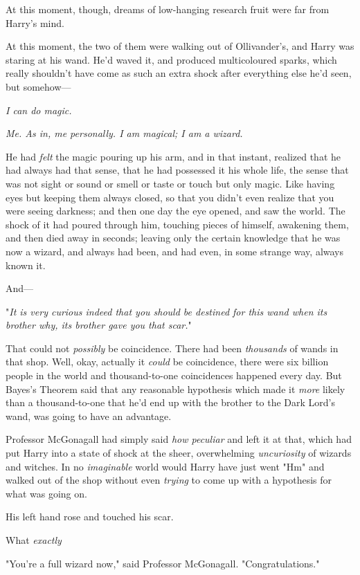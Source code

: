 At this moment, though, dreams of low-hanging research fruit were far from
Harry's mind.

At this moment, the two of them were walking out of Ollivander's, and Harry was
staring at his wand. He'd waved it, and produced multicoloured sparks, which
really shouldn't have come as such an extra shock after everything else he'd
seen, but somehow—

\emph{I can do magic.}

\emph{Me. As in, me personally. I am magical; I am a wizard.}

He had \emph{felt} the magic pouring up his arm, and in that instant, realized
that he had always had that sense, that he had possessed it his whole life, the
sense that was not sight or sound or smell or taste or touch but only magic.
Like having eyes but keeping them always closed, so that you didn't even
realize that you were seeing darkness; and then one day the eye opened, and saw
the world. The shock of it had poured through him, touching pieces of himself,
awakening them, and then died away in seconds; leaving only the certain
knowledge that he was now a wizard, and always had been, and had even, in some
strange way, always known it.

And—

"\emph{It is very curious indeed that you should be destined for this wand when
its brother why, its brother gave you that scar.}"

That could not \emph{possibly} be coincidence. There had been \emph{thousands}
of wands in that shop. Well, okay, actually it \emph{could} be coincidence,
there were six billion people in the world and thousand-to-one coincidences
happened every day. But Bayes's Theorem said that any reasonable hypothesis
which made it \emph{more} likely than a thousand-to-one that he'd end up with
the brother to the Dark Lord's wand, was going to have an advantage.

Professor McGonagall had simply said \emph{how peculiar} and left it at that,
which had put Harry into a state of shock at the sheer, overwhelming
\emph{uncuriosity} of wizards and witches. In no \emph{imaginable} world would
Harry have just went "Hm" and walked out of the shop without even \emph{trying}
to come up with a hypothesis for what was going on.

His left hand rose and touched his scar.

What{\el} \emph{exactly{\el}}

"You're a full wizard now," said Professor McGonagall. "Congratulations."

